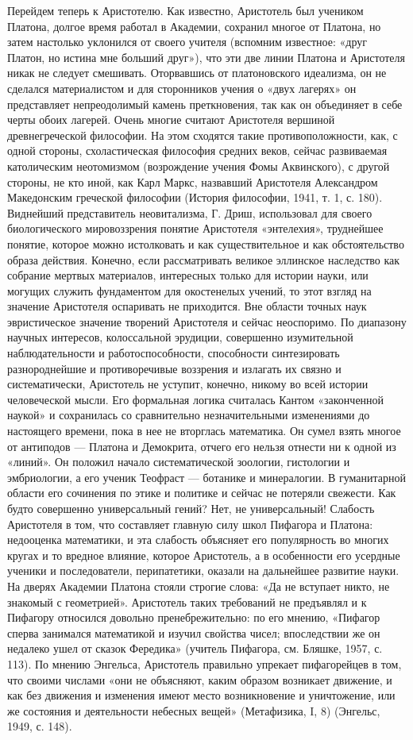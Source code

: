 Перейдем теперь к Аристотелю. Как известно, Аристотель был
учеником Платона, долгое время работал в Академии, сохранил многое от
Платона, но затем настолько уклонился от своего учителя (вспомним
известное: «друг Платон, но истина мне больший друг»), что эти две
линии Платона и Аристотеля никак не следует смешивать. Оторвавшись от
платоновского идеализма, он не сделался материалистом и для
сторонников учения о «двух лагерях» он представляет непреодолимый
камень преткновения, так как он объединяет в себе черты обоих лагерей.
Очень многие считают Аристотеля вершиной древнегреческой философии. На
этом сходятся такие противоположности, как, с одной стороны,
схоластическая философия средних веков, сейчас развиваемая
католическим неотомизмом (возрождение учения Фомы Аквинского), с
другой стороны, не кто иной, как Карл Маркс, назвавший Аристотеля
Александром Македонским греческой философии (История философии, 1941,
т. 1, с. 180). Виднейший представитель неовитализма, Г. Дриш,
использовал для своего биологического мировоззрения понятие Аристотеля
«энтелехия», труднейшее понятие, которое можно истолковать и как
существительное и как обстоятельство образа действия. Конечно, если
рассматривать великое эллинское наследство как собрание мертвых
материалов, интересных только для истории науки, или могущих служить
фундаментом для окостенелых учений, то этот взгляд на значение
Аристотеля оспаривать не приходится. Вне области точных наук
эвристическое значение творений Аристотеля и сейчас неоспоримо. По
диапазону научных интересов, колоссальной эрудиции, совершенно
изумительной наблюдательности и работоспособности, способности
синтезировать разнороднейшие и противоречивые воззрения и излагать их
связно и систематически, Аристотель не уступит, конечно, никому во
всей истории человеческой мысли. Его формальная логика считалась
Кантом «законченной наукой» и сохранилась со сравнительно
незначительными изменениями до настоящего времени, пока в нее не
вторглась математика. Он сумел взять многое от антиподов --- Платона и
Демокрита, отчего его нельзя отнести ни к одной из «линий». Он положил
начало систематической зоологии, гистологии и эмбриологии, а его
ученик Теофраст --- ботанике и минералогии. В гуманитарной области его
сочинения по этике и политике и сейчас не потеряли свежести. Как будто
совершенно универсальный гений? Нет, не универсальный! Слабость
Аристотеля в том, что составляет главную силу школ Пифагора и Платона:
недооценка математики, и эта слабость объясняет его популярность во
многих кругах и то вредное влияние, которое Аристотель, а в
особенности его усердные ученики и последователи, перипатетики,
оказали на дальнейшее развитие науки. На дверях Академии Платона
стояли строгие слова: «Да не вступает никто, не знакомый с
геометрией». Аристотель таких требований не предъявлял и к Пифагору
относился довольно пренебрежительно: по его мнению, «Пифагор сперва
занимался математикой и изучил свойства чисел; впоследствии же он
недалеко ушел от сказок Фередика» (учитель Пифагора, см. Бляшке, 1957,
с. 113). По мнению Энгельса, Аристотель правильно упрекает
пифагорейцев в том, что своими числами «они не объясняют, каким
образом возникает движение, и как без движения и изменения имеют место
возникновение и уничтожение, или же состояния и деятельности небесных
вещей» (Метафизика, I, 8) (Энгельс, 1949, с. 148).

